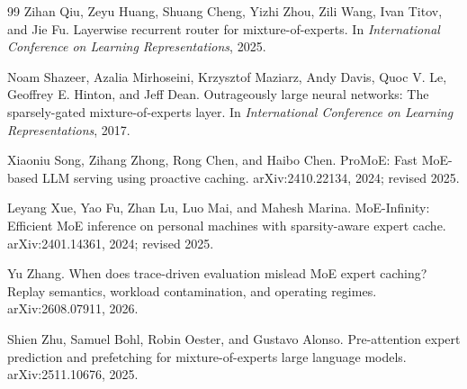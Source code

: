 \documentclass[11pt]{article}
\begin{document}
\begin{thebibliography}{99}
Zihan Qiu, Zeyu Huang, Shuang Cheng, Yizhi Zhou, Zili Wang, Ivan Titov, and Jie Fu.
\newblock Layerwise recurrent router for mixture-of-experts.
\newblock In \emph{International Conference on Learning Representations}, 2025.

Noam Shazeer, Azalia Mirhoseini, Krzysztof Maziarz, Andy Davis, Quoc V. Le, Geoffrey E. Hinton, and Jeff Dean.
\newblock Outrageously large neural networks: The sparsely-gated mixture-of-experts layer.
\newblock In \emph{International Conference on Learning Representations}, 2017.

Xiaoniu Song, Zihang Zhong, Rong Chen, and Haibo Chen.
\newblock ProMoE: Fast MoE-based LLM serving using proactive caching.
\newblock arXiv:2410.22134, 2024; revised 2025.

Leyang Xue, Yao Fu, Zhan Lu, Luo Mai, and Mahesh Marina.
\newblock MoE-Infinity: Efficient MoE inference on personal machines with sparsity-aware expert cache.
\newblock arXiv:2401.14361, 2024; revised 2025.

Yu Zhang.
\newblock When does trace-driven evaluation mislead MoE expert caching? Replay semantics, workload contamination, and operating regimes.
\newblock arXiv:2608.07911, 2026.

Shien Zhu, Samuel Bohl, Robin Oester, and Gustavo Alonso.
\newblock Pre-attention expert prediction and prefetching for mixture-of-experts large language models.
\newblock arXiv:2511.10676, 2025.

\end{thebibliography}
\end{document}
